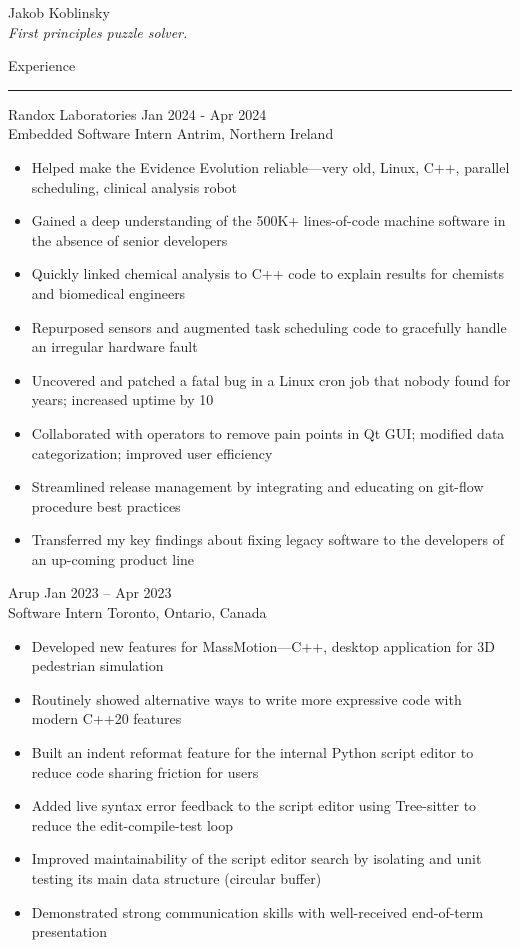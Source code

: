 \documentclass{article}
\begin{document}
\begin{center}
{\huge Jakob Koblinsky} \\
\textit{First principles puzzle solver.}
\end{center}

{\large Experience} \\
\rule{\linewidth}{0.4pt}

Randox Laboratories \hfill Jan 2024 - Apr 2024 \\
Embedded Software Intern \hfill Antrim, Northern Ireland
\begin{itemize}[noitemsep,left=0pt]
	\item Helped make the Evidence Evolution reliable—very old, Linux, C++, parallel scheduling, clinical analysis robot
	\item Gained a deep understanding of the 500K+ lines-of-code machine software in the absence of senior developers
	\item Quickly linked chemical analysis to C++ code to explain results for chemists and biomedical engineers
	\item Repurposed sensors and augmented task scheduling code to gracefully handle an irregular hardware fault
	\item Uncovered and patched a fatal bug in a Linux cron job that nobody found for years; increased uptime by 10%
	\item Collaborated with operators to remove pain points in Qt GUI; modified data categorization; improved user efficiency
	\item Streamlined release management by integrating and educating on git-flow procedure best practices
	\item Transferred my key findings about fixing legacy software to the developers of an up-coming product line
\end{itemize}

Arup \hfill Jan 2023 – Apr 2023 \\
Software Intern \hfill Toronto, Ontario, Canada
\begin{itemize}
	\item Developed new features for MassMotion—C++, desktop application for 3D pedestrian simulation
	\item Routinely showed alternative ways to write more expressive code with modern C++20 features
	\item Built an indent reformat feature for the internal Python script editor to reduce code sharing friction for users
	\item Added live syntax error feedback to the script editor using Tree-sitter to reduce the edit-compile-test loop
	\item Improved maintainability of the script editor search by isolating and unit testing its main data structure (circular buffer)
	\item Demonstrated strong communication skills with well-received end-of-term presentation
\end{itemize}
\end{document}
